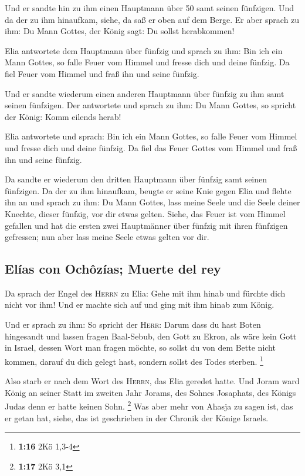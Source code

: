  Und er sandte hin zu ihm einen Hauptmann über 50 samt
seinen fünfzigen. Und da der zu ihm hinaufkam, siehe, da saß er oben auf
dem Berge. Er aber sprach zu ihm: Du Mann Gottes, der König sagt: Du
sollst herabkommen!

 Elia antwortete dem Hauptmann über fünfzig und sprach zu
ihm: Bin ich ein Mann Gottes, so falle Feuer vom Himmel und fresse dich
und deine fünfzig. Da fiel Feuer vom Himmel und fraß ihn und seine
fünfzig.

 Und er sandte wiederum einen anderen Hauptmann über
fünfzig zu ihm samt seinen fünfzigen. Der antwortete und sprach zu ihm:
Du Mann Gottes, so spricht der König: Komm eilends herab!

 Elia antwortete und sprach: Bin ich ein Mann Gottes, so
falle Feuer vom Himmel und fresse dich und deine fünfzig. Da fiel das
Feuer Gottes vom Himmel und fraß ihn und seine fünfzig.

 Da sandte er wiederum den dritten Hauptmann über fünfzig
samt seinen fünfzigen. Da der zu ihm hinaufkam, beugte er seine Knie
gegen Elia und flehte ihn an und sprach zu ihm: Du Mann Gottes, lass
meine Seele und die Seele deiner Knechte, dieser fünfzig, vor dir etwas
gelten.  Siehe, das Feuer ist vom Himmel gefallen und hat
die ersten zwei Hauptmänner über fünfzig mit ihren fünfzigen gefressen;
nun aber lass meine Seele etwas gelten vor dir.

\hypertarget{eluxedas-con-ochuxf4zuxedas-muerte-del-rey}{%
\subsection{Elías con Ochôzías; Muerte del
rey}\label{eluxedas-con-ochuxf4zuxedas-muerte-del-rey}}

 Da sprach der Engel des \textsc{Herrn} zu Elia: Gehe mit
ihm hinab und fürchte dich nicht vor ihm! Und er machte sich auf und
ging mit ihm hinab zum König.

 Und er sprach zu ihm: So spricht der \textsc{Herr}:
Darum dass du hast Boten hingesandt und lassen fragen Baal-Sebub, den
Gott zu Ekron, als wäre kein Gott in Israel, dessen Wort man fragen
möchte, so sollst du von dem Bette nicht kommen, darauf du dich gelegt
hast, sondern sollst des Todes sterben. \footnote{\textbf{1:16} 2Kö
  1,3-4}

 Also starb er nach dem Wort des \textsc{Herrn}, das Elia
geredet hatte. Und Joram ward König an seiner Statt im zweiten Jahr
Jorams, des Sohnes Josaphats, des Königs Judas denn er hatte keinen
Sohn. \footnote{\textbf{1:17} 2Kö 3,1}  Was aber mehr von
Ahasja zu sagen ist, das er getan hat, siehe, das ist geschrieben in der
Chronik der Könige Israels.

